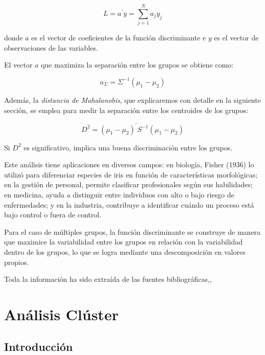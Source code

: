 \[
L = a^{'}y = \sum_{j=1}^{N} a_{j}y_{j}
\]

donde $a$ es el vector de coeficientes de la función discriminante e $y$ es el vector de observaciones de las variables. \newline

El vector $a$ que maximiza la separación entre los grupos se obtiene como:

\[
a_{\Sigma} = \Sigma^{-1}(\mu_{1}-\mu_{2})
\]

Además, la \textit{distancia de Mahalanobis}, que explicaremos con detalle en la siguiente sección, se emplea para medir la separación entre
los centroides de los grupos:

\[
D^{2} = (\mu_{1}-\mu_{2})^{'}S^{-1}(\mu_{1}-\mu_{2})
\]

Si $D^{2}$ es significativo, implica una buena discriminación entre los grupos. \newline

Este análisis tiene aplicaciones en diversos campos: en biología, Fisher (1936) lo utilizó para diferenciar especies de iris en función de
características morfológicas; en la gestión de personal, permite clasificar profesionales según sus habilidades; en medicina, ayuda a distinguir
entre individuos con alto o bajo riesgo de enfermedades; y en la industria, contribuye a identificar cuándo un proceso está bajo control o fuera 
de control. \newline

Para el caso de múltiples grupos, la función discriminante se construye de manera que maximice la variabilidad entre los grupos en relación con 
la variabilidad dentro de los grupos, lo que se logra mediante una descomposición en valores propios. \newline

Toda la información ha sido extraída de las fuentes bibliográficas\cite{bejar-PCA},\cite{bejar-AF}\cite{Bib-5},\cite{Bib-6} %

\section{Análisis Clúster}


\subsection{Introducción}

